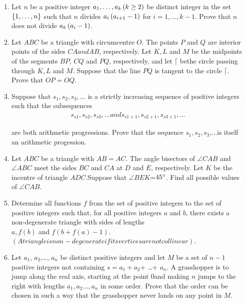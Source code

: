 \documentclass[12pt,-letter paper]{article}                       \usepackage{gvv}
\begin{document}
\begin{enumerate}
	\item Let $n$ be a positive integer $a_1,\dots,a_k\left(k\geq 2\right)$ be distinct integer in the set $\left\{1,\dots, n\right\}$ such that $n$ divides $a_i \left(a_{i+1}-1\right)$ for $i=1,\dots, k-1$. Prove that $n$ does not divide $ a_k \left(a_i-1\right)$.
\item Let $ABC$ be a triangle with circumcentre $O$. The points $P$ and $Q$ are interior points of the sides $CA and AB$, respectively. Let $K,L$ and $M$ be the midpoints of the segments $BP$, $CQ$ and $PQ$, respectively, and let $\lceil$ bethe circle passing through $K,L$ and $M$. Suppose that the line $PQ$ is tangent to the circle $\lceil$. Prove that $OP=OQ$.
\item Suppose that $s_1, s_2, s_3,\dots $ is a strictly increasing sequence of positive integers such that the subsequences	\begin{align}
	s_{s1}, s_{s2}, s_{s3},\dots and s_{s1+1}, s_{s2+1}, s_{s3+1},\dots
	\end{align}
	   
are both arithmetic progressions. Prove that the sequence $s_1,s_2,s_3$,...is itself an arithmetic progession.
\item Let $ABC$ be a triangle with $AB=AC$. The angle bisectors of $\angle CAB$ and $\angle ABC$ meet the sides $BC$ and $CA$ at $D$ and $E$, respectively. Let $K$ be the incentre of triangle $ADC$.Suppose that $\angle BEK$=$45\degree$. Find all possible values of $\angle CAB$.
\item  Determine all functions $f$ from the set of positive integers to the set of positive integers
such that, for all positive integers $a$ and $b$, there exists a non-degenerate triangle with sides of lengths
		\\$a, f (b)$ and $f (b+f(a)-1).$ \\
		$(A triangle is non-degenerate if its vertices are not collinear)$.
\item Let $a_{1}$, $a_{2}$,\dots, $a_{n}$ be distinct positive integers and let $M$ be a set of $n-1$ positive integers not containing $s = a_{1}+a_{2}$+ \dots + $a_{n}$. A grasshopper is to jump along the real axis, starting at the point 0and making $n$ jumps to the right with lengths $a_1, a_2\dots,a_n$ in some order. Prove that the order can be chosen in such a way that the grasshopper never lands on any point in $M$.
\end{enumerate}
\end{document}
